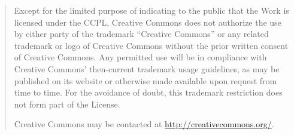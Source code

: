 \documentclass[letterpaper,10pt,english]{manual}
\begin{document}
\begin{enumerate}
\begin{quote}
Except for the limited purpose of indicating to the public that the Work is licensed under the CCPL, Creative Commons does not authorize the use by either party of the trademark ``Creative Commons'' or any related trademark or logo of Creative Commons without the prior written consent of Creative Commons. Any permitted use will be in compliance with Creative Commons' then-current trademark usage guidelines, as may be published on its website or otherwise made available upon request from time to time. For the avoidance of doubt, this trademark restriction does not form part of the License.

Creative Commons may be contacted at \href{http://creativecommons.org/}{http://creativecommons.org/}.
\end{quote}

\end{enumerate}
\end{document}
